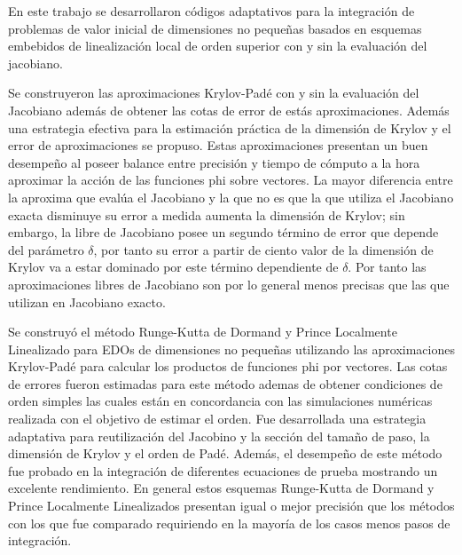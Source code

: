 \begin{conclusions}

    En este trabajo se desarrollaron códigos adaptativos para la integración de problemas de valor
    inicial de dimensiones no pequeñas basados en esquemas embebidos de linealización local de orden
    superior con y sin la evaluación del jacobiano.

    Se construyeron las aproximaciones Krylov-Padé con y sin la evaluación del Jacobiano además de obtener las cotas de error de estás aproximaciones. Además una estrategia efectiva para la estimación práctica de la dimensión de Krylov y el error de aproximaciones se propuso. Estas aproximaciones presentan un buen desempeño al poseer balance entre precisión y tiempo de cómputo a la hora aproximar la acción de las funciones phi sobre vectores. La mayor diferencia entre la aproxima que evalúa el Jacobiano y la que no es que la que utiliza el Jacobiano exacta disminuye su error a medida aumenta la dimensión de Krylov; sin embargo, la libre de Jacobiano posee un segundo término de error que depende del parámetro $\delta$, por tanto su error a partir de ciento valor de la dimensión de Krylov va a estar dominado por este término dependiente de $\delta$. Por tanto las aproximaciones libres de Jacobiano son por lo general menos precisas que las que utilizan en Jacobiano exacto.

    Se construyó el método Runge-Kutta de Dormand y Prince Localmente Linealizado para EDOs de dimensiones no pequeñas utilizando las aproximaciones Krylov-Padé para calcular los productos de funciones phi por vectores. Las cotas de errores fueron estimadas para este método ademas de obtener condiciones de orden simples las cuales están en concordancia con las simulaciones numéricas realizada con el objetivo de estimar el orden. Fue desarrollada una estrategia adaptativa para reutilización del Jacobino y la sección del tamaño de paso, la dimensión de Krylov y el orden de Padé. Además, el desempeño de este método fue probado en la integración de diferentes ecuaciones de prueba mostrando un excelente rendimiento. En general estos esquemas Runge-Kutta de Dormand y Prince Localmente Linealizados presentan igual o mejor precisión que los métodos con los que fue comparado requiriendo en la mayoría de los casos menos pasos de integración.


\end{conclusions}
